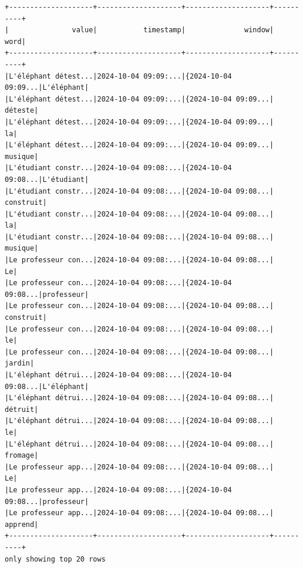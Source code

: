 \documentclass[
  letterpaper,
  DIV=11,
  numbers=noendperiod]{scrartcl}
\begin{document}
\begin{verbatim}
+--------------------+--------------------+--------------------+----------+
|               value|           timestamp|              window|      word|
+--------------------+--------------------+--------------------+----------+
|L'éléphant détest...|2024-10-04 09:09:...|{2024-10-04 09:09...|L'éléphant|
|L'éléphant détest...|2024-10-04 09:09:...|{2024-10-04 09:09...|   déteste|
|L'éléphant détest...|2024-10-04 09:09:...|{2024-10-04 09:09...|        la|
|L'éléphant détest...|2024-10-04 09:09:...|{2024-10-04 09:09...|   musique|
|L'étudiant constr...|2024-10-04 09:08:...|{2024-10-04 09:08...|L'étudiant|
|L'étudiant constr...|2024-10-04 09:08:...|{2024-10-04 09:08...| construit|
|L'étudiant constr...|2024-10-04 09:08:...|{2024-10-04 09:08...|        la|
|L'étudiant constr...|2024-10-04 09:08:...|{2024-10-04 09:08...|   musique|
|Le professeur con...|2024-10-04 09:08:...|{2024-10-04 09:08...|        Le|
|Le professeur con...|2024-10-04 09:08:...|{2024-10-04 09:08...|professeur|
|Le professeur con...|2024-10-04 09:08:...|{2024-10-04 09:08...| construit|
|Le professeur con...|2024-10-04 09:08:...|{2024-10-04 09:08...|        le|
|Le professeur con...|2024-10-04 09:08:...|{2024-10-04 09:08...|    jardin|
|L'éléphant détrui...|2024-10-04 09:08:...|{2024-10-04 09:08...|L'éléphant|
|L'éléphant détrui...|2024-10-04 09:08:...|{2024-10-04 09:08...|   détruit|
|L'éléphant détrui...|2024-10-04 09:08:...|{2024-10-04 09:08...|        le|
|L'éléphant détrui...|2024-10-04 09:08:...|{2024-10-04 09:08...|   fromage|
|Le professeur app...|2024-10-04 09:08:...|{2024-10-04 09:08...|        Le|
|Le professeur app...|2024-10-04 09:08:...|{2024-10-04 09:08...|professeur|
|Le professeur app...|2024-10-04 09:08:...|{2024-10-04 09:08...|   apprend|
+--------------------+--------------------+--------------------+----------+
only showing top 20 rows
\end{verbatim}
\end{document}

